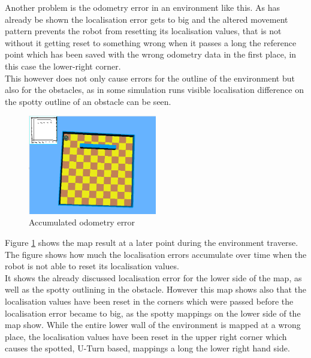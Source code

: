 Another problem is the odometry error in an environment like this. As has already be shown the localisation error gets to big and the altered movement pattern prevents the robot from resetting its localisation values, that is not without it getting reset to something wrong when it passes a long the reference point which has been saved with the wrong odometry data in the first place, in this case the lower-right corner. \\
This however does not only cause errors for the outline of the environment but also for the obstacles, as in some simulation runs visible localisation difference on the spotty outline of an obstacle can be seen. \\[3ex]

\begin{figure}[h]
\centering
\includegraphics[width = 0.5\textwidth]{../../figures/map_results/one_obstacle_odometry_error.png} 
\caption{Accumulated odometry error}
\label{one_obstacle_odometry_error}
\end{figure}

Figure \ref{one_obstacle_odometry_error} shows the map result at a later point during the environment traverse. The figure shows how much the localisation errors accumulate  over time when the robot is not able to reset its localisation values. \\
It shows the already discussed localisation error for the lower side of the map, as well as the spotty outlining in the obstacle. However this map shows also that the localisation values have been reset in the corners which were passed before the localisation error became to big, as the spotty mappings on the lower side of the map show. While the entire lower wall of the environment is mapped at a wrong place, the localisation values have been reset in the upper right corner which causes the spotted, U-Turn based,  mappings a long the lower right hand side.\\

